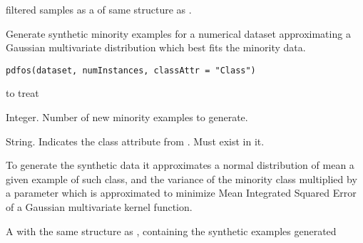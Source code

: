 %
\begin{Value}
filtered samples as a  of same structure as
.
\end{Value}
%
\begin{Examples}
\end{Examples}
%
\begin{Description}\relax
Generate synthetic minority examples for a numerical dataset approximating a
Gaussian multivariate distribution which best fits the minority data.
\end{Description}
%
\begin{Usage}
\begin{verbatim}
pdfos(dataset, numInstances, classAttr = "Class")
\end{verbatim}
\end{Usage}
%
\begin{Arguments}
\begin{ldescription}
\item[\code{dataset}]  to treat

\item[\code{numInstances}] Integer. Number of new minority examples to generate.

\item[\code{classAttr}] String. Indicates the class attribute from .
Must exist in it.
\end{ldescription}
\end{Arguments}
%
\begin{Details}\relax
To generate the synthetic data it approximates a normal distribution of mean
a given example of such class, and the variance of the minority class 
multiplied by a parameter which is approximated to minimize Mean Integrated
Squared Error of a Gaussian multivariate kernel function.
\end{Details}
%
\begin{Value}
A  with the same structure as ,
containing the synthetic examples generated
\end{Value}
